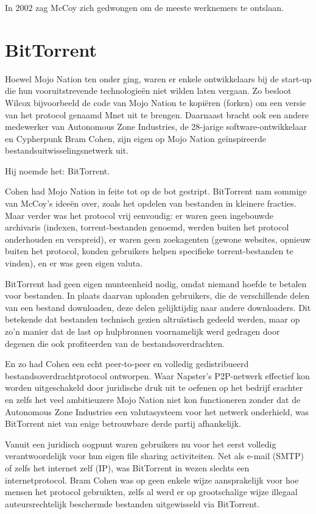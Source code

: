 \documentclass[
  a5paper,
  smalldemyvopaper,11pt,twoside,onecolumn,openright,extrafontsizes]{memoir}
\begin{document}
In 2002 zag McCoy zich gedwongen om de meeste werknemers te ontslaan.

\section{BitTorrent}\label{bittorrent}

Hoewel Mojo Nation ten onder ging, waren er enkele ontwikkelaars bij de
start-up die hun vooruitstrevende technologieën niet wilden laten
vergaan. Zo besloot Wilcox bijvoorbeeld de code van Mojo Nation te
kopiëren (forken) om een versie van het protocol genaamd Mnet uit te
brengen. Daarnaast bracht ook een andere medewerker van Autonomous Zone
Industries, de 28-jarige software-ontwikkelaar en Cypherpunk Bram Cohen,
zijn eigen op Mojo Nation geïnspireerde bestandsuitwisselingsnetwerk
uit.

Hij noemde het: BitTorrent.

Cohen had Mojo Nation in feite tot op de bot gestript. BitTorrent nam
sommige van McCoy's ideeën over, zoals het opdelen van bestanden in
kleinere fracties. Maar verder was het protocol vrij eenvoudig: er waren
geen ingebouwde archivaris (indexen, torrent-bestanden genoemd, werden
buiten het protocol onderhouden en verspreid), er waren geen zoekagenten
(gewone websites, opnieuw buiten het protocol, konden gebruikers helpen
specifieke torrent-bestanden te vinden), en er was geen eigen valuta.

BitTorrent had geen eigen munteenheid nodig, omdat niemand hoefde te
betalen voor bestanden. In plaats daarvan uploaden gebruikers, die de
verschillende delen van een bestand downloaden, deze delen gelijktijdig
naar andere downloaders. Dit betekende dat bestanden technisch gezien
altruïstisch gedeeld werden, maar op zo'n manier dat de last op
hulpbronnen voornamelijk werd gedragen door degenen die ook profiteerden
van de bestandsoverdrachten.

En zo had Cohen een echt peer-to-peer en volledig gedistribueerd
bestandsoverdrachtprotocol ontworpen. Waar Napster's P2P-netwerk
effectief kon worden uitgeschakeld door juridische druk uit te oefenen
op het bedrijf erachter en zelfs het veel ambitieuzere Mojo Nation niet
kon functioneren zonder dat de Autonomous Zone Industries een
valutasysteem voor het netwerk onderhield, was BitTorrent niet van enige
betrouwbare derde partij afhankelijk.

Vanuit een juridisch oogpunt waren gebruikers nu voor het eerst volledig
verantwoordelijk voor hun eigen file sharing activiteiten. Net als
e-mail (SMTP) of zelfs het internet zelf (IP), was BitTorrent in wezen
slechts een internetprotocol. Bram Cohen was op geen enkele wijze
aansprakelijk voor hoe mensen het protocol gebruikten, zelfs al werd er
op grootschalige wijze illegaal auteursrechtelijk beschermde bestanden
uitgewisseld via BitTorrent.
\end{document}
